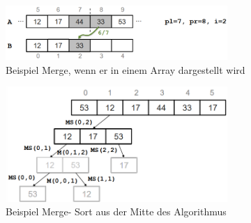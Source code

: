 \documentclass{article}
\begin{document}
            \begin{figure}[ht]
                \centering
                \includegraphics[width=0.75\textwidth]{Bilder/MergeBsp.png}
                \caption{Beispiel Merge, wenn er in einem Array dargestellt wird}
                \label{fig:MergeBsp}
            \end{figure}
            \begin{figure}[ht]
                \centering
                \includegraphics[width=0.75\textwidth]{Bilder/MergeSortBsp.png}
                \caption{Beispiel Merge- Sort aus der Mitte des Algorithmus}
                \label{fig:MergeSortBsp}
            \end{figure}
            \newpage
\end{document}
